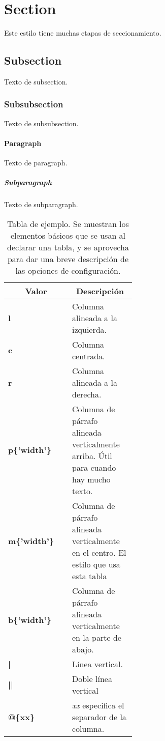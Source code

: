 \documentclass[11pt,spanish]{report}
\begin{document}
\section{Section}

Este estilo tiene muchas etapas de seccionamiento.

\subsection{Subsection}

Texto de subsection.

\subsubsection{Subsubsection}

Texto de subsubsection.

\paragraph{Paragraph}

Texto de paragraph.

\subparagraph{Subparagraph}

Texto de subparagraph.

\begin{table}
\centering
\caption[Tabla de ejemplo]{Tabla de ejemplo. Se muestran los elementos básicos que se usan al declarar una tabla, y se aprovecha para dar una breve descripción de las opciones de configuración.}
\label{tab:tabla_ejemplo}
\renewcommand{\arraystretch}{1.3}%
\begin{tabular}{lm{0.5\linewidth}} \toprule
\multicolumn{1}{c}{\textbf{Valor}} & \multicolumn{1}{c}{\textbf{Descripción}} \\ \midrule
\textbf{l} & Columna alineada a la izquierda. \\
\textbf{c} & Columna centrada. \\
\textbf{r} & Columna alineada a la derecha. \\
\textbf{p\{'width'\}} & Columna de párrafo alineada verticalmente arriba. Útil para cuando hay mucho texto. \\
\textbf{m\{'width'\}} & Columna de párrafo alineada verticalmente en el centro. El estilo que usa esta tabla\\
\textbf{b\{'width'\}} & Columna de párrafo alineada verticalmente en la parte de abajo. \\
\textbf{|} & Línea vertical. \\
\textbf{||} & Doble línea vertical \\
\textbf{@\{xx\}} & \emph{xx} especifica el separador de la columna. \\ \bottomrule
\end{tabular}
\end{table}
\end{document}
